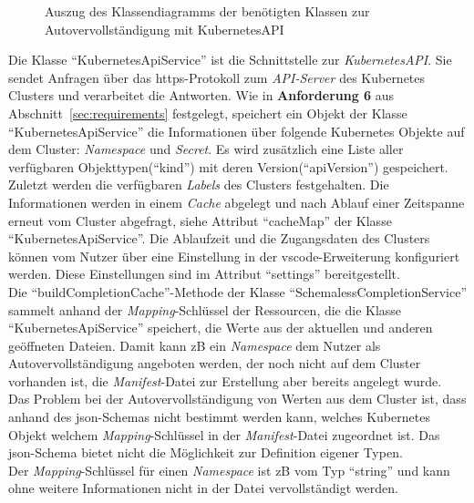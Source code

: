 \begin{figure}[htp] %
      \centering
      \caption{Auszug des Klassendiagramms der benötigten Klassen zur Autovervollständigung mit KubernetesAPI}
      \label{fig:class-diagram-yaml-language-service-schemaless-completion}
\end{figure}

Die Klasse ``KubernetesApiService'' ist die Schnittstelle zur \textit{KubernetesAPI}. Sie sendet Anfragen über das \ac{https}-Protokoll zum \textit{API-Server}
des Kubernetes Clusters und verarbeitet die Antworten. Wie in \textbf{Anforderung 6} aus Abschnitt~\ref{sec:requirements} festgelegt,
speichert ein Objekt der Klasse ``KubernetesApiService'' die Informationen über folgende Kubernetes Objekte auf dem Cluster: \textit{Namespace} und \textit{Secret}.
Es wird zusätzlich eine Liste aller verfügbaren Objekttypen(``kind'') mit deren Version(``apiVersion'') gespeichert.
Zuletzt werden die verfügbaren \textit{Labels} des Clusters festgehalten.
Die Informationen werden in einem \textit{Cache} abgelegt und nach Ablauf einer Zeitspanne erneut vom Cluster abgefragt, siehe
Attribut ``cacheMap'' der Klasse ``KubernetesApiService''.
Die Ablaufzeit und die Zugangsdaten des Clusters können vom Nutzer über eine Einstellung in der \ac{vscode}-Erweiterung
konfiguriert werden. Diese Einstellungen sind im Attribut ``settings'' bereitgestellt.
\\
Die ``buildCompletionCache''-Methode der Klasse ``SchemalessCompletionService'' sammelt anhand der \textit{Mapping}-Schlüssel
der Ressourcen, die die Klasse ``KubernetesApiService'' speichert, die Werte aus der aktuellen und anderen geöffneten Dateien.
Damit kann \ac{zB} ein \textit{Namespace} dem Nutzer als Autovervollständigung angeboten werden, der noch nicht auf dem Cluster vorhanden ist,
die \textit{Manifest}-Datei zur Erstellung aber bereits angelegt wurde.
\\
Das Problem bei der Autovervollständigung von Werten aus dem Cluster ist, dass anhand des \ac{json}-Schemas nicht bestimmt werden kann,
welches Kubernetes Objekt welchem \textit{Mapping}-Schlüssel in der \textit{Manifest}-Datei zugeordnet ist.
Das \ac{json}-Schema bietet nicht die Möglichkeit zur Definition eigener Typen.
\\
Der \textit{Mapping}-Schlüssel für einen \textit{Namespace} ist \ac{zB} vom Typ ``string'' und kann ohne weitere Informationen nicht in der Datei vervollständigt werden.
